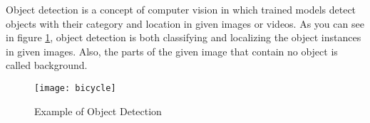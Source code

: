 \documentclass{article}
\begin{document}
\setlength{\parindent}{6ex}

\indent

Object detection is a concept of computer vision in which trained models 
detect objects with their category and location in given images or videos. 
As you can see in figure \ref{fig:bicycle1}, object detection is both 
classifying and localizing the object instances in given images. Also, the 
parts of the given image that contain no object is called background.

\begin{figure}
    \centering
    \texttt{[image: bicycle]}
    \caption{Example of Object Detection}
    \label{fig:bicycle1}
\end{figure}
\end{document}
